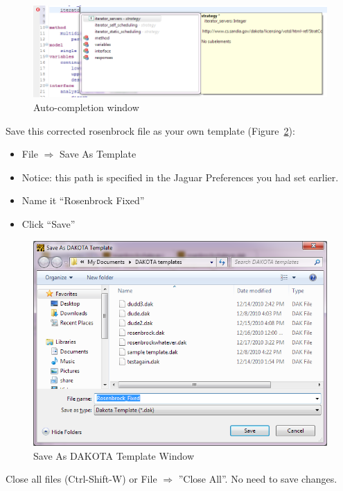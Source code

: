 \begin{figure}[htbp]
  \centering
  \includegraphics[scale=0.6]{images/8iterato}
  \caption{Auto-completion window}
  \label{fig:input:8iterato}
\end{figure}


Save this corrected rosenbrock file as your own template (Figure~\ref{fig:input:9SaveAsTemplate}):
\begin{itemize}
\item File $\Rightarrow$ Save As Template
\item Notice: this path is specified in the Jaguar Preferences you had set earlier.
\item Name it ``Rosenbrock Fixed''
\item Click ``Save''
\end{itemize} 
\begin{figure}[htbp]
  \centering
  \includegraphics[scale=0.6]{images/9SaveAsTemplate}
  \caption{Save As DAKOTA Template Window}
  \label{fig:input:9SaveAsTemplate}
\end{figure}


Close all files (Ctrl-Shift-W) or File $\Rightarrow$ ''Close All''. No need to save changes.


